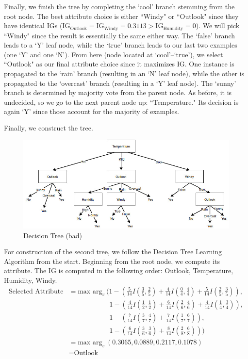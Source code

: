 \documentclass[12pt]{article}
\begin{document}
	Finally, we finish the tree by completing the `cool' branch stemming from the root node. The best attribute choice is either ``Windy" or ``Outlook" since they have identical IGs ($\text{IG}_{\text{Outlook}} = \text{IG}_{\text{Windy}} = 0.3113 > \text{IG}_{\text{Humidity}} = 0$). We will pick ``Windy" since the result is essentially the same either way. The `false' branch leads to a `Y' leaf node, while the `true' branch leads to our last two examples (one `Y' and one `N'). From here (node located at `cool'--`true'), we select ``Outlook" as our final attribute choice since it maximizes IG. One instance is propagated to the `rain' branch (resulting in an `N' leaf node), while the other is propagated to the `overcast' branch (resulting in a `Y' leaf node). The `sunny' branch is determined by majority vote from the parent node. As before, it is undecided, so we go to the next parent node up: ``Temperature." Its decision is again `Y' since those account for the majority of examples. \par
	Finally, we construct the tree.
	\begin{figure}[H]
		\begin{center}
			\includegraphics[width=440pt]{hw3_ml_tree1.jpg}
			\caption{Decision Tree (bad)}
			\label{fig:tree1}
		\end{center}
	\end{figure}
	For construction of the second tree, we follow the Decision Tree Learning Algorithm from the start. Beginning from the root node, we compute its attribute. The IG is computed in the following order: Outlook, Temperature, Humidity, Windy.
	\begin{align*}
	\text{Selected Attribute} &= \text{max arg}_{v} \  (1-(\frac{5}{14}I(\frac{3}{5},\frac{2}{5}) + \frac{4}{14}I(\frac{0}{4},\frac{4}{4}) + \frac{5}{14}I(\frac{2}{5},\frac{3}{5})), \\
	&\qquad\qquad\qquad 1-(\frac{4}{14}I(\frac{1}{2},\frac{1}{2}) + \frac{6}{14}I(\frac{2}{6},\frac{4}{6}) + \frac{4}{14}I(\frac{1}{4},\frac{3}{4})), \\
	&\qquad\qquad\qquad 1-(\frac{7}{14}I(\frac{3}{7},\frac{4}{7}) + \frac{7}{14}I(\frac{1}{7},\frac{6}{7})), \\
	&\qquad\qquad\qquad 1-(\frac{6}{14}I(\frac{3}{6},\frac{3}{6}) + \frac{8}{14}I(\frac{2}{8},\frac{6}{8}))) \\
	&= \text{max arg}_{v} \ (0.3065, 0.0889, 0.2117, 0.1078) \\
	&= \text{Outlook}
	\end{align*}
\end{document}
